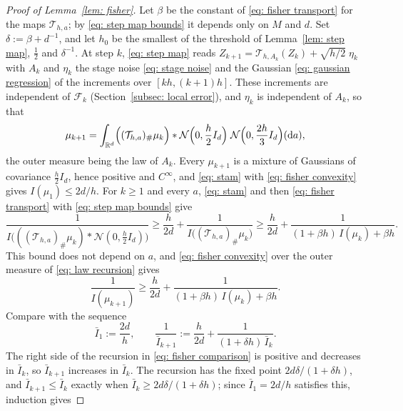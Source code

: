 \documentclass[namedate,webpdf,imanum]{ima-authoring-template}
\newcommand{\Le}{\leqslant}
\newcommand{\Ge}{\geqslant}
\newcommand{\D}{\mathrm{d}}
\theoremstyle{thmstyletwo}
\numberwithin{equation}{section}
\begin{document}
\begin{proof}[Proof of Lemma~\ref{lem: fisher}]
    Let $\beta$ be the constant of \eqref{eq: fisher transport} for the maps $\mathcal T_{h,a}$; by \eqref{eq: step map bounds} it depends only on $M$ and $d$. Set $\delta := \beta + d^{-1}$, and let $h_0$ be the smallest of the threshold of Lemma~\ref{lem: step map}, $\frac12$ and $\delta^{-1}$. At step $k$, \eqref{eq: step map} reads $Z_{k+1} = \mathcal T_{h, A_k}(Z_k) + \sqrt{h/2}\; \eta_k$ with $A_k$ and $\eta_k$ the stage noise \eqref{eq: stage noise} and the Gaussian \eqref{eq: gaussian regression} of the increments over $[kh, (k+1)h]$. These increments are independent of $\mathcal F_k$ (Section~\ref{subsec: local error}), and $\eta_k$ is independent of $A_k$, so that
    \begin{equation}
        \mu_{k+1} = \int_{\mathbb R^d} \Bigl( (\mathcal T_{h,a})_\# \mu_k \Bigr) * \mathcal N\Bigl( 0, \frac h2 I_d \Bigr) \; \mathcal N\Bigl( 0, \frac{2h}{3} I_d \Bigr)(\D a) ,
        \label{eq: law recursion}
    \end{equation}
    the outer measure being the law of $A_k$.
    Every $\mu_{k+1}$ is a mixture of Gaussians of covariance $\frac h2 I_d$, hence positive and $C^\infty$, and \eqref{eq: stam} with \eqref{eq: fisher convexity} gives $I(\mu_1) \Le 2d/h$. For $k \Ge 1$ and every $a$, \eqref{eq: stam} and then \eqref{eq: fisher transport} with \eqref{eq: step map bounds} give
    \begin{equation*}
        \frac{1}{I\bigl( ( (\mathcal T_{h,a})_\# \mu_k ) * \mathcal N(0, \frac h2 I_d) \bigr)}
        \Ge \frac{h}{2d} + \frac{1}{I\bigl( (\mathcal T_{h,a})_\# \mu_k \bigr)}
        \Ge \frac{h}{2d} + \frac{1}{(1 + \beta h)\, I(\mu_k) + \beta h} .
    \end{equation*}
    This bound does not depend on $a$, and \eqref{eq: fisher convexity} over the outer measure of \eqref{eq: law recursion} gives
    \begin{equation}
        \frac{1}{I(\mu_{k+1})} \Ge \frac{h}{2d} + \frac{1}{(1 + \beta h)\, I(\mu_k) + \beta h} .
        \label{eq: fisher recursion}
    \end{equation}
    Compare with the sequence
    \begin{equation}
        \bar I_1 := \frac{2d}{h} , \qquad
        \frac{1}{\bar I_{k+1}} := \frac{h}{2d} + \frac{1}{(1 + \delta h)\, \bar I_k} .
        \label{eq: fisher comparison}
    \end{equation}
    The right side of the recursion in \eqref{eq: fisher comparison} is positive and decreases in $\bar I_k$, so $\bar I_{k+1}$ increases in $\bar I_k$. The recursion has the fixed point $2 d \delta / (1 + \delta h)$, and $\bar I_{k+1} \Le \bar I_k$ exactly when $\bar I_k \Ge 2 d \delta / (1 + \delta h)$; since $\bar I_1 = 2d/h$ satisfies this, induction gives

\end{proof}
\end{document}
